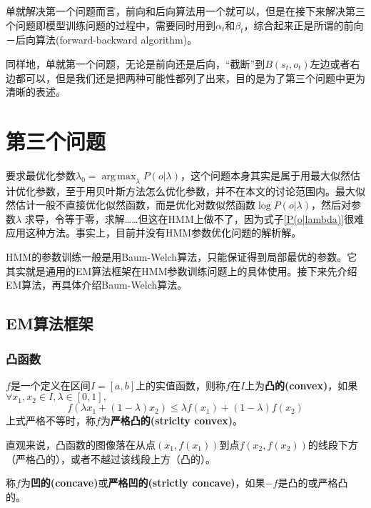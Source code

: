 \documentclass[11pt,a4paper]{article}
\DeclareMathOperator*{\argmax}{arg\,max}
\numberwithin{equation}{section}
\begin{document}
单就解决第一个问题而言，前向和后向算法用一个就可以，但是在接下来解决第三个问题即模型训练问题的过程中，需要同时用到$ \alpha_t $和$ \beta_t $，综合起来正是所谓的前向－后向算法(forward-backward algorithm)。

同样地，单就第一个问题，无论是前向还是后向，“截断”到$ B(s_t, o_t) $左边或者右边都可以，但是我们还是把两种可能性都列了出来，目的是为了第三个问题中更为清晰的表述。

\section{第三个问题}

要求最优化参数$ \lambda_0 = \argmax_{\lambda} P(o | \lambda) $，这个问题本身其实是属于用最大似然估计优化参数，至于用贝叶斯方法怎么优化参数，并不在本文的讨论范围内。最大似然估计一般不直接优化似然函数，而是优化对数似然函数$ \log P(o | \lambda) $，然后对参数$ \lambda $	求导，令等于零，求解……但这在HMM上做不了，因为式子\eqref{P(o|lambda)}很难应用这种方法。事实上，目前并没有HMM参数优化问题的解析解。

HMM的参数训练一般是用Baum-Welch算法，只能保证得到局部最优的参数。它其实就是通用的EM算法框架在HMM参数训练问题上的具体使用。接下来先介绍EM算法，再具体介绍Baum-Welch算法。

\subsection{EM算法框架}

\subsubsection{凸函数}

\begin{definition}\label{convex definition}
$ f $是一个定义在区间$ I = [a, b] $上的实值函数，则称$ f $在$ I $上为\textbf{凸的(convex)}，如果$ \forall x_1, x_2 \in I, \lambda \in [0, 1], $
\begin{equation*}
f(\lambda x_1 + (1 - \lambda) x_2) \le \lambda f(x_1) + (1 - \lambda) f(x_2)
\end{equation*}
上式严格不等时，称$ f $为\textbf{严格凸的(striclty convex)}。
\end{definition}

直观来说，凸函数的图像落在从点$ (x_1, f(x_1)) $到点$ f(x_2, f(x_2)) $的线段下方（严格凸的），或者不越过该线段上方（凸的）。

\begin{definition}\label{concave definition}
称$ f $为\textbf{凹的(concave)}或\textbf{严格凹的(strictly concave)}，如果$ -f $是凸的或严格凸的。
\end{definition}
\end{document}
